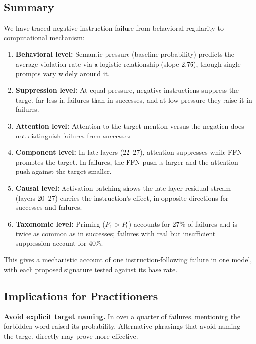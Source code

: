 \documentclass{article}
\begin{document}
\subsection{Summary}

We have traced negative instruction failure from behavioral regularity to computational mechanism:

\begin{enumerate}
    \item \textbf{Behavioral level:} Semantic pressure (baseline probability) predicts the average violation rate via a logistic relationship (slope 2.76), though single prompts vary widely around it.
    
    \item \textbf{Suppression level:} At equal pressure, negative instructions suppress the target far less in failures than in successes, and at low pressure they raise it in failures.
    
    \item \textbf{Attention level:} Attention to the target mention versus the negation does not distinguish failures from successes.
    
    \item \textbf{Component level:} In late layers (22--27), attention suppresses while FFN promotes the target. In failures, the FFN push is larger and the attention push against the target smaller.
    
    \item \textbf{Causal level:} Activation patching shows the late-layer residual stream (layers 20--27) carries the instruction's effect, in opposite directions for successes and failures.
    
    \item \textbf{Taxonomic level:} Priming ($P_1 > P_0$) accounts for 27\% of failures and is twice as common as in successes; failures with real but insufficient suppression account for 40\%.
\end{enumerate}

This gives a mechanistic account of one instruction-following failure in one model, with each proposed signature tested against its base rate.

\subsection{Implications for Practitioners}

\textbf{Avoid explicit target naming.} In over a quarter of failures, mentioning the forbidden word raised its probability. Alternative phrasings that avoid naming the target directly may prove more effective.
\end{document}
